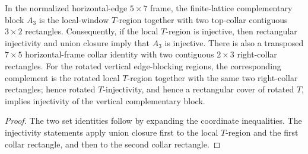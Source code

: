 \begin{lemma}%
    \label{lem:peps_normalSquareEdgeComplementRegion_topCollar}
    \leanok
    In the normalized horizontal-edge $5\times7$ frame, the finite-lattice
    complementary block $A_3$ is the local-window $T$-region together with
    two top-collar contiguous $3\times2$ rectangles. Consequently, if the
    local $T$-region is injective, then rectangular injectivity and union
    closure imply that $A_3$ is injective. There is also a transposed
    $7\times5$ horizontal-frame collar identity with two contiguous
    $2\times3$ right-collar rectangles. For the rotated vertical
    edge-blocking regions, the corresponding complement is the rotated local
    $T$-region together with the same two right-collar rectangles; hence rotated
    $T$-injectivity, and hence a rectangular cover of rotated $T$, implies
    injectivity of the vertical complementary block.
    \begin{center}
        \TNPEPSNormalEdgeComplementTopCollar
    \end{center}
\end{lemma}
\begin{proof}\leanok
    The two set identities follow by expanding the coordinate inequalities.
    The injectivity statements apply union closure first to the local
    $T$-region and the first collar rectangle, and then to the second collar
    rectangle.
\end{proof}

